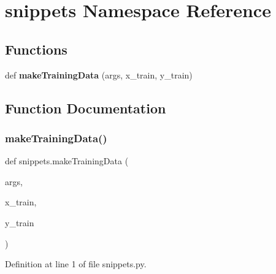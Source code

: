 \section{snippets Namespace Reference}
\label{namespacesnippets}
\subsection*{Functions}
\begin{DoxyCompactItemize}
\item 
def \textbf{ make\+Training\+Data} (args, x\+\_\+train, y\+\_\+train)
\end{DoxyCompactItemize}


\subsection{Function Documentation}
\mbox{\label{namespacesnippets_a7e52d1600efee3605c1763f2210c3fd2}} 
\subsubsection{make\+Training\+Data()}
{\footnotesize\ttfamily def snippets.\+make\+Training\+Data (\begin{DoxyParamCaption}\item[{}]{args,  }\item[{}]{x\+\_\+train,  }\item[{}]{y\+\_\+train }\end{DoxyParamCaption})}



Definition at line 1 of file snippets.\+py.

